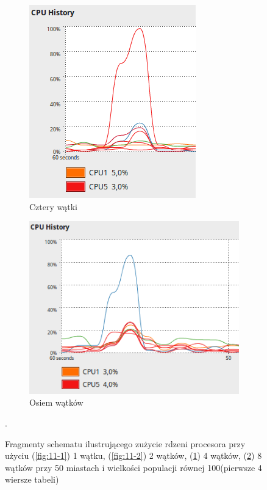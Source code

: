 \documentclass[10pt,a4paper]{article}
\begin{document}
\begin{figure}[H]
    \begin{subfigure}[b]{0.4\textwidth}
        \includegraphics[width=\textwidth]{11-4.png}
        \caption{Cztery wątki}
        \label{fig:11-4}
    \end{subfigure}
    \begin{subfigure}[b]{0.4\textwidth}
            \includegraphics[width=\textwidth]{11-8.png}
            \caption{Osiem wątków}
            \label{fig:11-8}
    \end{subfigure}
    \caption{Fragmenty schematu ilustrującego zużycie rdzeni procesora przy użyciu (\ref{fig:11-1}) 1 wątku, (\ref{fig:11-2}) 2 wątków, (\ref{fig:11-4}) 4 wątków, (\ref{fig:11-8}) 8 wątków przy 50 miastach i wielkości populacji równej 100(pierwsze 4 wiersze tabeli)}\label{fig:11}. 
\end{figure}
\end{document}
